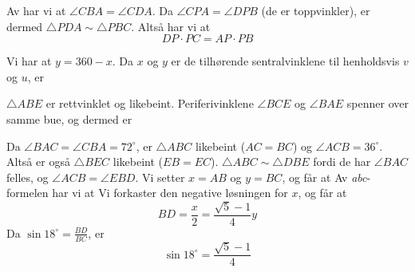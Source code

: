 




\footnotesize

Av  har vi at $ \angle CBA=\angle CDA $. Da $ \angle CPA=\angle DPB $ (de er toppvinkler), er dermed $ \triangle PDA \sim \triangle PBC$. Altså har vi at
\[ DP\cdot PC=AP\cdot PB \]

Vi har at $ y=360-x $. Da $ x $ og $ y $ er de tilhørende sentralvinklene til henholdsvis $ v $ og $ u $, er

\newpage
{}
$ \triangle ABE $ er rettvinklet og likebeint. Periferivinklene $ \angle BCE $ og $ \angle BAE $ spenner over samme bue, og dermed er

Da $ \angle BAC=\angle CBA=72^\circ $, er $ \triangle ABC $ likebeint ($ AC=BC $) og $ \angle ACB= 36^\circ $. Altså er også $ \triangle BEC $ likebeint ($ EB=EC $). $ \triangle ABC \sim \triangle DBE$ fordi de har $ \angle BAC $ felles, og $ \angle ACB=\angle EBD $. Vi setter $ x=AB $ og $ y=BC $, og får at
Av \textit{abc}-formelen har vi at
Vi forkaster den negative løsningen for $ x $, og får at
\[BD=\frac{x}{2}=\frac{\sqrt{5}-1}{4}y  \]
Da $ \sin 18^\circ=\frac{BD}{BC} $, er
\[ \sin 18^\circ = \frac{\sqrt{5}-1}{4} \]



